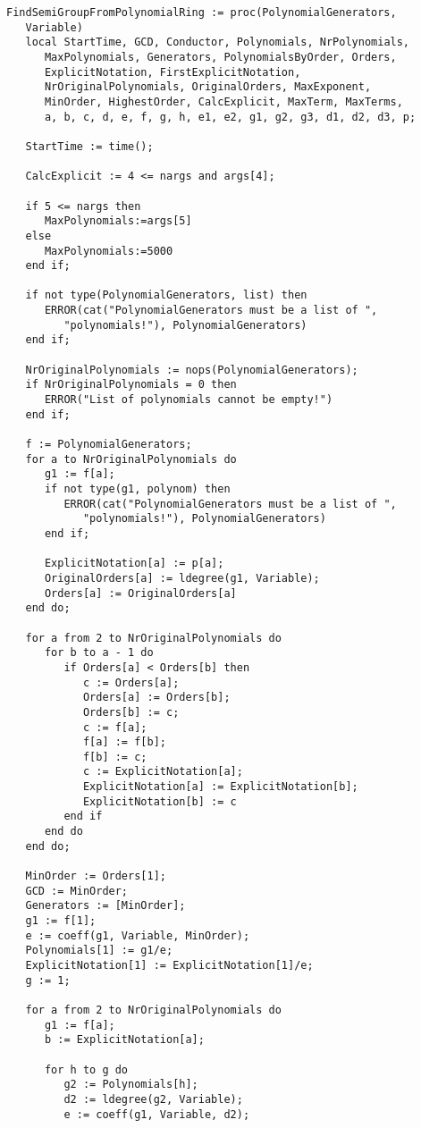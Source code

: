 \begin{verbatim}
FindSemiGroupFromPolynomialRing := proc(PolynomialGenerators, 
   Variable)
   local StartTime, GCD, Conductor, Polynomials, NrPolynomials,
      MaxPolynomials, Generators, PolynomialsByOrder, Orders,
      ExplicitNotation, FirstExplicitNotation, 
      NrOriginalPolynomials, OriginalOrders, MaxExponent, 
      MinOrder, HighestOrder, CalcExplicit, MaxTerm, MaxTerms, 
      a, b, c, d, e, f, g, h, e1, e2, g1, g2, g3, d1, d2, d3, p;

   StartTime := time();

   CalcExplicit := 4 <= nargs and args[4];

   if 5 <= nargs then
      MaxPolynomials:=args[5]
   else
      MaxPolynomials:=5000
   end if;

   if not type(PolynomialGenerators, list) then
      ERROR(cat("PolynomialGenerators must be a list of ",
         "polynomials!"), PolynomialGenerators)
   end if;

   NrOriginalPolynomials := nops(PolynomialGenerators);
   if NrOriginalPolynomials = 0 then
      ERROR("List of polynomials cannot be empty!")
   end if;

   f := PolynomialGenerators;
   for a to NrOriginalPolynomials do
      g1 := f[a];
      if not type(g1, polynom) then
         ERROR(cat("PolynomialGenerators must be a list of ",
            "polynomials!"), PolynomialGenerators)
      end if;

      ExplicitNotation[a] := p[a];
      OriginalOrders[a] := ldegree(g1, Variable);
      Orders[a] := OriginalOrders[a]
   end do;

   for a from 2 to NrOriginalPolynomials do
      for b to a - 1 do
         if Orders[a] < Orders[b] then
            c := Orders[a];
            Orders[a] := Orders[b];
            Orders[b] := c;
            c := f[a];
            f[a] := f[b];
            f[b] := c;
            c := ExplicitNotation[a];
            ExplicitNotation[a] := ExplicitNotation[b];
            ExplicitNotation[b] := c
         end if
      end do
   end do;

   MinOrder := Orders[1];
   GCD := MinOrder;
   Generators := [MinOrder];
   g1 := f[1];
   e := coeff(g1, Variable, MinOrder);
   Polynomials[1] := g1/e;
   ExplicitNotation[1] := ExplicitNotation[1]/e;
   g := 1;

   for a from 2 to NrOriginalPolynomials do
      g1 := f[a];
      b := ExplicitNotation[a];

      for h to g do
         g2 := Polynomials[h];
         d2 := ldegree(g2, Variable);
         e := coeff(g1, Variable, d2);


\end{verbatim}
